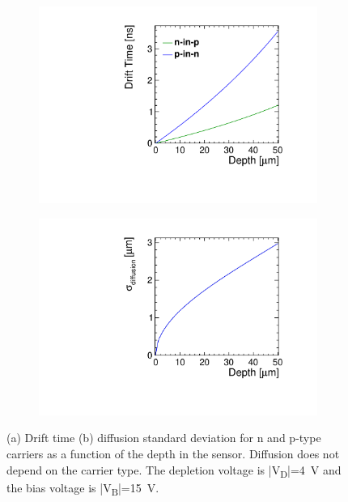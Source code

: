 \begin{figure}[htbp]
  \centering
  \begin{subfigure}[b]{0.45\textwidth}
    \includegraphics[width=\textwidth]{figures/ChargeSharing/DriftTime_n_vs_p_carrier.pdf}
    \caption{}
  \end{subfigure}\hfill
  \begin{subfigure}[b]{0.45\textwidth}
    \includegraphics[width=\textwidth]{figures/ChargeSharing/Diffusion_n_vs_p_carrier.pdf}
    \caption{}
  \end{subfigure}
  \caption{(a) Drift time (b) diffusion standard deviation for n and
    p-type carriers as a function of the depth in the
    sensor. Diffusion does not depend on the carrier type. The
    depletion voltage is |V\textsubscript{D}|=4~V and the bias voltage
    is |V\textsubscript{B}|=15~V.}\label{fig:Drift_n_vs_p}
\end{figure}


